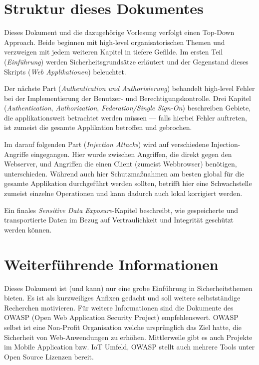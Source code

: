 \section{Struktur dieses Dokumentes}

Dieses Dokument und die dazugehörige Vorlesung verfolgt einen Top-Down Approach. Beide beginnen mit high-level organisatorischen Themen und verzweigen mit jedem weiteren Kapitel in tiefere Gefilde. Im ersten Teil (\textit{Einführung}) werden Sicherheitsgrundsätze erläutert und der Gegenstand dieses Skripts (\textit{Web Applikationen}) beleuchtet.

Der nächste Part (\textit{Authentication und Authorisierung}) behandelt high-level Fehler bei der Implementierung der Benutzer- und Berechtigungskontrolle. Drei Kapitel (\textit{Authentication}, \textit{Authorization}, \textit{Federation/Single Sign-On}) beschreiben Gebiete, die applikationsweit betrachtet werden müssen --- falls hierbei Fehler auftreten, ist zumeist die gesamte Applikation betroffen und gebrochen.

Im darauf folgenden Part (\textit{Injection Attacks}) wird auf verschiedene Injection-Angriffe eingegangen. Hier wurde zwischen Angriffen, die direkt gegen den Webserver, und Angriffen die einen Client (zumeist Webbrowser) benötigen, unterschieden. Während auch hier Schutzmaßnahmen am besten global für die gesamte Applikation durchgeführt werden sollten, betrifft hier eine Schwachstelle zumeist einzelne Operationen und kann dadurch auch lokal korrigiert werden.

Ein finales \textit{Sensitive Data Exposure}-Kapitel beschreibt, wie gespeicherte und transportierte Daten im Bezug auf Vertraulichkeit und Integrität geschützt werden können.

\section{Weiterführende Informationen}

Dieses Dokument ist (und kann) nur eine grobe Einführung in Sicherheitsthemen bieten. Es ist als kurzweiliges Anfixen gedacht und soll weitere selbstständige Recherchen motivieren. Für weitere Informationen sind die Dokumente des OWASP (Open Web Application Security Project) empfehlenswert. OWASP selbst ist eine Non-Profit Organisation welche ursprünglich das Ziel hatte, die Sicherheit von Web-Anwendungen zu erhöhen. Mittlerweile gibt es auch Projekte im Mobile Application bzw. IoT Umfeld, OWASP stellt auch mehrere Tools unter Open Source Lizenzen bereit.

